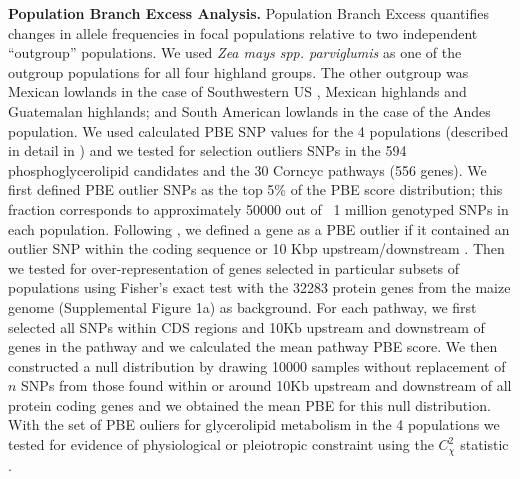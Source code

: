 \documentclass[9pt,twocolumn,twoside,lineno]{BioRxiv}
\begin{document}
\textbf{Population Branch Excess Analysis.}
Population Branch Excess quantifies changes in allele frequencies in focal populations relative to two independent “outgroup” populations.
We used \textit{Zea mays spp. parviglumis} as one of the outgroup populations for all four highland groups.  
The other outgroup was  Mexican lowlands  in the case of Southwestern US , Mexican highlands and Guatemalan highlands; and South American lowlands in the case of the Andes population. 
We used calculated PBE SNP values for the 4 populations (described in detail in \cite{Wang2020-mp}) and we tested for selection outliers SNPs in the 594 phosphoglycerolipid candidates and the 30 Corncyc pathways (556 genes).
We first defined PBE outlier SNPs as the top 5\% of the PBE score distribution; this fraction corresponds to approximately 50000 out of ~1 million genotyped SNPs in each population. 
Following \citet{Wang2020-mp}, we defined a gene as a PBE outlier if it contained an outlier SNP within the coding sequence or 10 Kbp upstream/downstream  . 
Then we tested for over-representation of genes selected in particular subsets of populations using Fisher's exact test with the 32283 protein genes from the maize genome (Supplemental Figure 1a) \cite{wang2015a} as background. 
For each pathway, we first selected all SNPs within CDS regions and 10Kb upstream and downstream of genes in the pathway and we calculated the mean pathway PBE score. 
We then constructed a null distribution by drawing 10000 samples without replacement of $n$ SNPs from those found within or around 10Kb upstream and downstream of all protein coding genes and we obtained the mean PBE for this null distribution. 
With the set of PBE ouliers for glycerolipid metabolism in the 4 populations we tested for evidence of physiological or pleiotropic constraint using the $C_\chi^2$ statistic \cite{yeaman2018}. 
\end{document}

